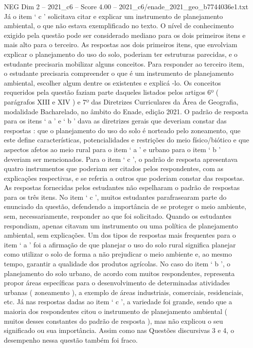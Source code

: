 \begin{textsample}{NEG Dim 2 – 2021\_c6 – Score 4.00 – 2021\_c6/enade\_2021\_geo\_b7744036e1.txt}
Já o item ‘ c ’ solicitava citar e explicar um instrumento de planejamento ambiental, o que não estava exemplificado no texto.
O nível de conhecimento exigido pela questão pode ser considerado mediano para os dois primeiros itens e mais alto para o terceiro.
As respostas aos dois primeiros itens, que envolviam explicar o planejamento do uso do solo, poderiam ter estruturas parecidas, e o estudante precisaria mobilizar alguns conceitos.
Para responder ao terceiro item, o estudante precisaria compreender o que é um instrumento de planejamento ambiental, escolher algum dentre os existentes e explicá -lo.
Os conceitos requeridos pela questão faziam parte daqueles listados pelos artigos 6º ( parágrafos XIII e XIV ) e 7º das Diretrizes Curriculares da Área de Geografia, modalidade Bacharelado, no âmbito do Enade, edição 2021.
O padrão de resposta para os itens ‘ a ’ e ‘ b ’ dava as diretrizes gerais que deveriam constar das respostas : que o planejamento do uso do solo é norteado pelo zoneamento, que este define características, potencialidades e restrições do meio físico/biótico e que aspectos afetos ao meio rural para o item ‘ a ’ e urbano para o item ‘ b ’ deveriam ser mencionados.
Para o item ‘ c ’, o padrão de resposta apresentava quatro instrumentos que poderiam ser citados pelos respondentes, com as explicações respectivas, e se referia a outros que poderiam constar das respostas.
As respostas fornecidas pelos estudantes não espelharam o padrão de respostas para os três itens.
No item ‘ c ’, muitos estudantes parafrasearam parte do enunciado da questão, defendendo a importância de se proteger o meio ambiente, sem, necessariamente, responder ao que foi solicitado.
Quando os estudantes respondiam, apenas citavam um instrumento ou uma política de planejamento ambiental, sem explicações.
Um dos tipos de respostas mais frequentes para o item ‘ a ’ foi a afirmação de que planejar o uso do solo rural significa planejar como utilizar o solo de forma a não prejudicar o meio ambiente e, ao mesmo tempo, garantir a qualidade dos produtos agrícolas.
No caso do item ‘ b ’, o planejamento do solo urbano, de acordo com muitos respondentes, representa propor áreas específicas para o desenvolvimento de determinadas atividades urbanas ( zoneamento ), a exemplo de áreas industriais, comerciais, residenciais, etc.
Já nas respostas dadas ao item ‘ c ’, a variedade foi grande, sendo que a maioria dos respondentes citou o instrumento de planejamento ambiental ( muitos desses constantes do padrão de resposta ), mas não explicou o seu significado ou sua importância.
Assim como nas Questões discursivas 3 e 4, o desempenho nessa questão também foi fraco.

\end{textsample}
